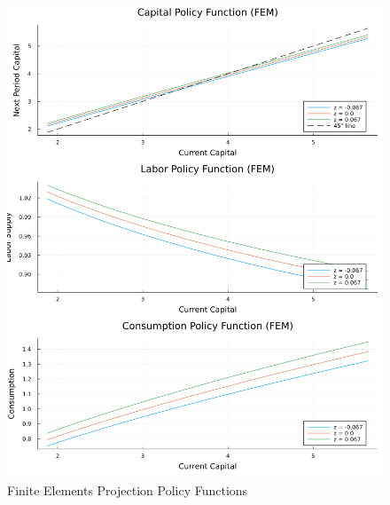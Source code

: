 \documentclass[12pt]{article}
\theoremstyle{plain}
\theoremstyle{definition}
\theoremstyle{remark}
\begin{document}
	\begin{figure}[H]
		\centering
		\includegraphics[width=\textwidth]{q2fin.png}
		\caption{Finite Elements Projection Policy Functions}
	\end{figure}
	\pagebreak
	
\end{document}
